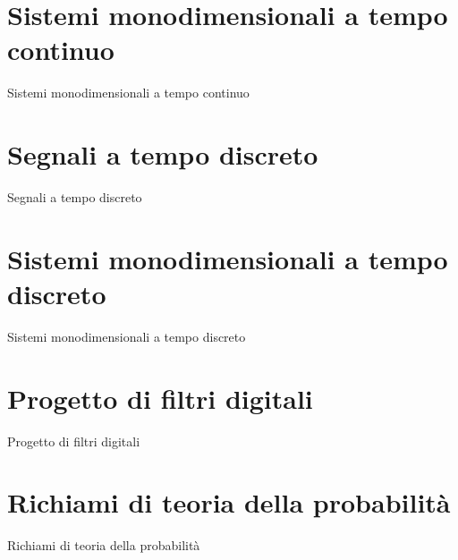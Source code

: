 \documentclass[12pt,oneside,openany]{memoir}
\numberwithin{equation}{subsection}
\begin{document}

\newpage
\section{Sistemi monodimensionali a tempo continuo}
Sistemi monodimensionali a tempo continuo


\newpage
\section{Segnali a tempo discreto}
Segnali a tempo discreto


\newpage
\section{Sistemi monodimensionali a tempo discreto}
Sistemi monodimensionali a tempo discreto


\newpage
\section{Progetto di filtri digitali}
Progetto di filtri digitali


\newpage
\section{Richiami di teoria della probabilit\`a}
Richiami di teoria della probabilit\`a
\end{document}

